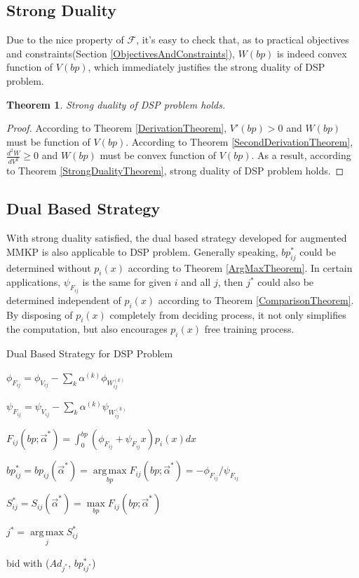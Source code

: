 \documentclass{article}
\DeclareMathOperator*{\argmax}{arg\,max}
\newtheorem{theorem}{Theorem}[section]
\newcommand{\sbp}{bp_{ij}}
\newcommand{\sV}{V_{ij}}
\newcommand{\sW}{W_{ij}^{(k)}}
\newcommand{\salpha}{\alpha^{(k)}}
\newcommand{\sF}{F_{ij}}
\newcommand{\sS}{S_{ij}}
\newcommand{\valpha}{\vec{\alpha}}
\newcommand{\pprob}{\phi}
\newcommand{\pcost}{\psi}
\newcommand{\uff}{\mathscr{F}}
\begin{document}
\subsection{Strong Duality}

Due to the nice property of $\uff$, it's easy to check that,
    as to practical objectives and constraints(Section \ref{ObjectivesAndConstraints}),
    $W(bp)$ is indeed convex function of $V(bp)$,
    which immediately justifies the strong duality of DSP problem.

\begin{theorem} \label{DSPStrongDualityTheorem}
Strong duality of DSP problem holds.
\end{theorem}

\begin{proof}
According to Theorem \ref{DerivationTheorem}, $V'(bp)>0$ and $W(bp)$ must be function of $V(bp)$.
According to Theorem \ref{SecondDerivationTheorem}, $\frac{d^2W}{dV^2}\ge0$ and $W(bp)$ must be convex function of $V(bp)$.
As a result, according to Theorem \ref{StrongDualityTheorem}, strong duality of DSP problem holds.
\end{proof}

\subsection{Dual Based Strategy} \label{DSPDualBasedStrategy}

With strong duality satisfied, the dual based strategy developed for augmented MMKP is also applicable to DSP problem.
Generally speaking, $\sbp^*$ could be determined without $p_i(x)$ according to Theorem \ref{ArgMaxTheorem}.
In certain applications, $\pcost_{\sF}$ is the same for given $i$ and all $j$,
    then $j^*$ could also be determined independent of $p_i(x)$ according to Theorem \ref{ComparisonTheorem}.
By disposing of $p_i(x)$ completely from deciding process, it not only simplifies the computation,
    but also encourages $p_i(x)$ free training process.

\begin{algorithm}
\caption{Dual Based Strategy for DSP Problem}

{
  {
    $\pprob_{\sF} = \pprob_{\sV} - \sum\limits_k \salpha \pprob_{\sW}$

    $\pcost_{\sF} = \pcost_{\sV} - \sum\limits_k \salpha \pcost_{\sW}$

    $\sF(bp; \valpha^*) = \int_0^{bp} (\pprob_{\sF}+\pcost_{\sF}x)p_i(x)dx$

    $\sbp^* = \sbp(\valpha^*) = \argmax\limits_{bp} \sF(bp; \valpha^*) = -\pprob_{\sF} / \pcost_{\sF}$

    $\sS^* = \sS(\valpha^*) = \max\limits_{bp} \sF(bp; \valpha^*)$
  }
  $j^* = \argmax\limits_j \sS^*$
  
   { bid with ($Ad_{j^*}$, $bp_{ij^*}^*$) }
}
\end{algorithm}
\end{document}

